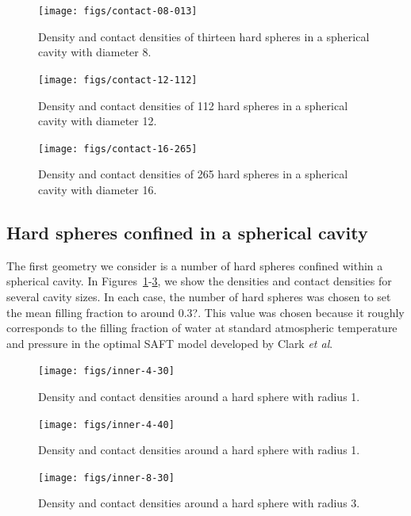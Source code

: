 \documentclass[letterpaper,twocolumn,amsmath,amssymb,prb]{revtex4-1}
\begin{document}
\begin{figure}
  \texttt{[image: figs/contact-08-013]}
  \caption{Density and contact densities of thirteen hard spheres in a
    spherical cavity with diameter 8. \sphereExplanation }
  \label{fig:sphere-8}
\end{figure}

\begin{figure}
  \texttt{[image: figs/contact-12-112]}
  \caption{Density and contact densities of 112 hard spheres in a
    spherical cavity with diameter 12.  \sphereExplanation}
  \label{fig:sphere-12}
\end{figure}

\begin{figure}
  \texttt{[image: figs/contact-16-265]}
  \caption{Density and contact densities of 265 hard spheres in a
    spherical cavity with diameter 16. \sphereExplanation}
  \label{fig:sphere-16}
\end{figure}

\subsection{Hard spheres confined in a spherical cavity}

The first geometry we consider is a number of hard spheres confined
within a spherical cavity.  In
Figures~\ref{fig:sphere-8}-\ref{fig:sphere-16}, we show
the densities and contact densities for several cavity sizes.  In each
case, the number of hard spheres was chosen to set the mean filling
fraction to around 0.3?.  This value was chosen because it roughly
corresponds to the filling fraction of water at standard atmospheric
temperature and pressure in the optimal SAFT model developed by Clark
\emph{et al}\cite{clark2006developing}.



\begin{figure}
  \texttt{[image: figs/inner-4-30]}
  \caption{Density and contact densities around a hard sphere with
    radius 1.}
  \label{fig:inner-4-30}
\end{figure}

\begin{figure}
  \texttt{[image: figs/inner-4-40]}
  \caption{Density and contact densities around a hard sphere with
    radius 1.}
  \label{fig:inner-4-40}
\end{figure}

\begin{figure}
  \texttt{[image: figs/inner-8-30]}
  \caption{Density and contact densities around a hard sphere with
    radius 3.}
  \label{fig:inner-8-30}
\end{figure}
\end{document}
